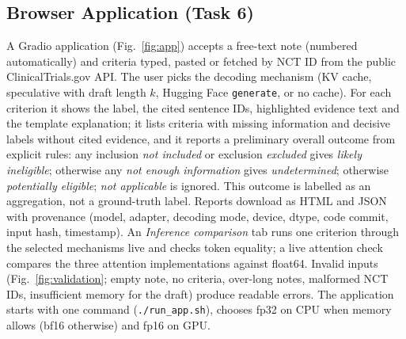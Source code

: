 \documentclass[conference]{IEEEtran}
\begin{document}
\subsection{Browser Application (Task 6)}
A Gradio application (Fig.~\ref{fig:app}) accepts a free-text note (numbered automatically) and criteria typed, pasted or fetched by NCT ID from the public ClinicalTrials.gov API. The user picks the decoding mechanism (KV cache, speculative with draft length $k$, Hugging Face \texttt{generate}, or no cache). For each criterion it shows the label, the cited sentence IDs, highlighted evidence text and the template explanation; it lists criteria with missing information and decisive labels without cited evidence, and it reports a preliminary overall outcome from explicit rules: any inclusion \emph{not included} or exclusion \emph{excluded} gives \emph{likely ineligible}; otherwise any \emph{not enough information} gives \emph{undetermined}; otherwise \emph{potentially eligible}; \emph{not applicable} is ignored. This outcome is labelled as an aggregation, not a ground-truth label. Reports download as HTML and JSON with provenance (model, adapter, decoding mode, device, dtype, code commit, input hash, timestamp). An \emph{Inference comparison} tab runs one criterion through the selected mechanisms live and checks token equality; a live attention check compares the three attention implementations against float64. Invalid inputs (Fig.~\ref{fig:validation}; empty note, no criteria, over-long notes, malformed NCT IDs, insufficient memory for the draft) produce readable errors. The application starts with one command (\texttt{./run\_app.sh}), chooses fp32 on CPU when memory allows (bf16 otherwise) and fp16 on GPU.
\end{document}
